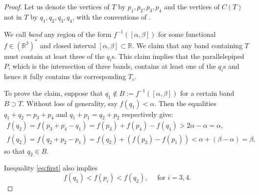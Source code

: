 \documentclass{amsart}
\theoremstyle{plain}
\theoremstyle{definition}
\newcommand{\R}{ \ensuremath{\mathbb{R}}}
\begin{document}
\begin{proof}
Let us denote the vertices of $T$ by $p_1, p_2, p_3, p_4$ and the vertices of $C(T)$ not in $T$ by $q_1, q_2, q_3, q_4$, with the conventions of . 

We call \emph{band} any region of the form $f^{-1}([\alpha,\beta])$ for some functional $f\in (\R^3)^*$ and closed interval $[\alpha,\beta]\subset \R$.
We claim that any band containing $T$ must contain at least three of the $q_i$s. 
This claim implies that the parallelepiped $P$, which is the intersection of three bands, contains at least one of the $q_i$s and hence it fully contains the corresponding $T_i$.

To prove the claim, suppose that $q_1\not\in B:= f^{-1}([\alpha,\beta])$ for a certain band $B \supset T$. 
Without loss of generality, say $f(q_1)<\alpha$. Then the equalities $q_1+q_2=p_3+p_4$ and $q_1+p_1=q_2+p_2$ respectively give:
\begin{gather}
\label{eq:first}
f(q_2) = f(p_3+p_4-q_1) = f(p_3)+f(p_4)-f(q_1) > 2\alpha-\alpha=\alpha,\\
\label{eq:second}
f(q_2) = f(q_2+p_2-p_1) = f(q_2)+(f(p_2)-f(p_1)) < \alpha + (\beta-\alpha) = \beta,
\end{gather}
so that $q_2 \in B$.

Inequality \eqref{eq:first} also implies
\begin{equation}
\label{eq:third}
f(q_1) <  f(p_i) < f(q_2), \quad\text{ for $i=3,4$}.
\end{equation}


\end{proof}
\end{document}
